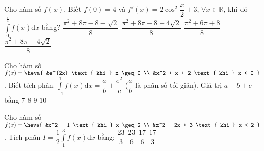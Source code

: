 \begin{ex}%
	Cho hàm số $f(x)$. Biết $f(0) = 4$ và $f'(x) = 2 \cos^2 \dfrac{x}{2} + 3$, $\forall x \in \mathbb{R}$, khi đó $\displaystyle\int\limits_{0}^{\frac{\pi}{4}} f(x) \mathrm{d}x$ bằng?
	\choice
	{$\dfrac{\pi^2 + 8\pi - 8 - \sqrt{2}}{8}$}
	{\True$\dfrac{\pi^2 + 8\pi - 8 - 4\sqrt{2}}{8}$}
	{$\dfrac{\pi^2 + 6\pi + 8}{8}$}
	{$\dfrac{\pi^2 + 8\pi - 4\sqrt{2}}{8}$}

\end{ex}
\begin{ex}%
	Cho hàm số $f(x) = \heva{
		&e^{2x} \text{ khi } x \geq 0 \\
		&x^2 + x + 2 \text{ khi } x < 0 
	}$. Biết tích phân $\displaystyle\int\limits_{-1}^{1} f(x) \mathrm{d}x = \dfrac{a}{b} + \dfrac{e^2}{c}$ ($\dfrac{a}{b}$ là phân số tối giản). Giá trị $a + b + c$ bằng
	\choice
	{$7$}
	{$8$}
	{\True$9$}
	{$10$}
\end{ex}
\begin{ex}%
	Cho hàm số $f(x) = \heva{
		&x^2 - 1 \text{ khi } x \geq 2 \\
		&x^2 - 2x + 3 \text{ khi } x < 2 
	}$. Tích phân $I = \dfrac{1}{2} \displaystyle\int\limits_{1}^{3} f(x) \mathrm{d}x$ bằng:
	\choice
	{$\dfrac{23}{3}$}
	{\True $\dfrac{23}{6}$}
	{$\dfrac{17}{6}$}
	{$\dfrac{17}{3}$}
\end{ex}

